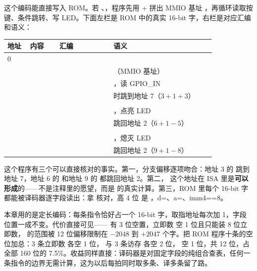 这个编码能直接写入 ROM。若 、，程序先用 + 拼出 MMIO 基址 ，再循环读取按键、条件跳转、写 LED。下面左栏是 ROM 中的真实 16-bit 字，右栏是对应汇编和语义：

\begin{longtable}{L{0.1\linewidth}L{0.13\linewidth}L{0.24\linewidth}L{0.45\linewidth}}
\toprule
地址 & 内容 & 汇编 & 语义 \\
 &  &  &  \\ &  &  & （MMIO 基址） \\ &  &  & ，读 GPIO\_IN \\ &  &  &  时跳到地址 7（$3+1+3$） \\ &  &  &  \\ &  &  & ，点亮 LED \\ &  &  & 跳回地址 2（$6+1-5$） \\ &  &  &  \\ &  &  & ，熄灭 LED \\ &  &  & 跳回地址 2（$9+1-8$） \\
\bottomrule
\end{longtable}

这个程序有三个可以直接核对的事实。第一，分支偏移逐项吻合：地址 3 的  跳到地址 7，地址 6 的  和地址 9 的  都跳回地址 2。第二， 这个地址在 ISA 里是\textbf{可以形成}的——不是注释里的愿望，而是  的真实计算。第三，ROM 里每个 16-bit 字都能被译码器逐字段读出：拿  核对，高 4 位  是 ，d=、a=、imm4==8。

本章用的是定长编码：每条指令恰好占一个 16-bit 字，取指地址每次加 1，字段位置一成不变。代价直接可见—— 有 3 位空置，立即数  空 1 位且只能装 8 位立即数， 的范围被 12 位偏移限制在 $-2048$ 到 $+2047$ 个字。把 ROM 程序十条的空位加总：3 条立即数  各空 1 位， 与 3 条访存  各空 2 位， 空 1 位，共 12 位，占全部 160 位的 7.5\%。收益同样直接：译码器是对固定字段的纯组合查表，任何一条指令的边界无需计算，这为以后每拍同时取多条、译多条留了路。

